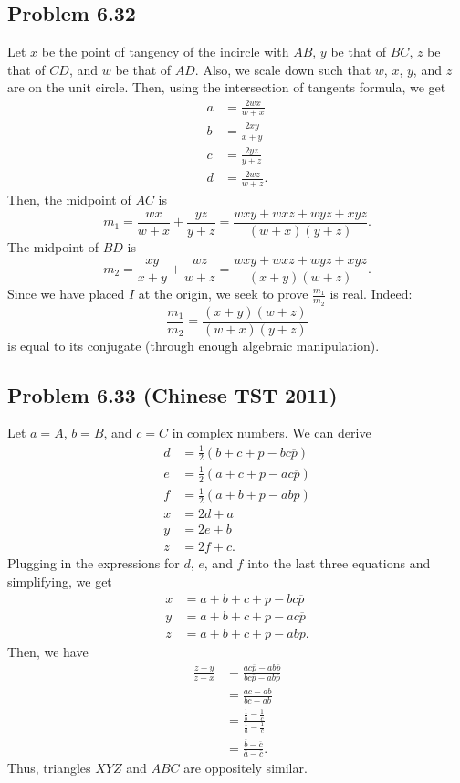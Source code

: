 \documentclass{scrartcl}
\begin{document}
\subsection*{Problem 6.32}
Let $x$ be the point of tangency of the incircle with $AB$, $y$ be that of $BC$, $z$ be that of $CD$, and $w$ be that of $AD$.
Also, we scale down such that $w$, $x$, $y$, and $z$ are on the unit circle.
Then, using the intersection of tangents formula, we get
\begin{align*}
    a &= \frac{2wx}{w + x} \\
    b &= \frac{2xy}{x + y} \\
    c &= \frac{2yz}{y + z} \\
    d &= \frac{2wz}{w + z}.
\end{align*}
Then, the midpoint of $AC$ is
\[
    m_1 = \frac{wx}{w + x} + \frac{yz}{y + z} = \frac{wxy + wxz + wyz + xyz}{(w + x)(y + z)}.
\]
The midpoint of $BD$ is
\[
    m_2 = \frac{xy}{x + y} + \frac{wz}{w + z} = \frac{wxy + wxz + wyz + xyz}{(x + y)(w + z)}.
\]
Since we have placed $I$ at the origin, we seek to prove $\frac{m_1}{m_2}$ is real. Indeed:
\[
    \frac{m_1}{m_2} = \frac{(x + y)(w + z)}{(w + x)(y + z)}
\]
is equal to its conjugate (through enough algebraic manipulation).
\subsection*{Problem 6.33 (Chinese TST 2011)}
Let $a = A$, $b = B$, and $c = C$ in complex numbers. We can derive
\begin{align*}
    d &= \frac{1}{2} (b + c + p - bc\overline{p}) \\
    e &= \frac{1}{2} (a + c + p - ac\overline{p}) \\
    f &= \frac{1}{2} (a + b + p - ab\overline{p}) \\
    x &= 2d + a \\
    y &= 2e + b \\
    z &= 2f + c. 
\end{align*}
Plugging in the expressions for $d$, $e$, and $f$ into the last three equations and simplifying, we get
\begin{align*}
    x &= a + b + c + p - bc \overline{p} \\
    y &= a + b + c + p - ac \overline{p} \\
    z &= a + b + c + p - ab \overline{p}.
\end{align*}
Then, we have
\begin{align*}
    \frac{z-y}{z-x} &= \frac{ac \overline{p} - ab \overline{p}}{bc \overline{p} - ab \overline{p}} \\
                    &= \frac{ac-ab}{bc-ab} \\
                    &= \frac{\frac{1}{b} - \frac{1}{c}}{\frac{1}{a} - \frac{1}{c}} \\
                    &= \frac{\overline{b}- \overline{c}}{\overline{a} - \overline{c}}.
\end{align*}
Thus, triangles $XYZ$ and $ABC$ are oppositely similar.
\end{document}
